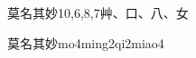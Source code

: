 \begin{entry}{莫名其妙}{10,6,8,7}{⾋、⼝、⼋、⼥}
  \begin{phonetics}{莫名其妙}{mo4ming2qi2miao4}
  \end{phonetics}
\end{entry}

